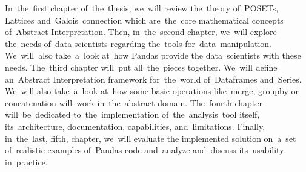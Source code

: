 In~the~first chapter of~the~thesis, we~will review the~theory of~POSETs, Lattices and~Galois~connection which
are~the~core mathematical concepts of~Abstract Interpretation.
Then, in~the~second chapter, we~will explore the~needs of~data scientists regarding the~tools for~data~manipulation.
We~will~also take~a~look at~how Pandas provide the data~scientists with these needs.
The~third chapter will~put all~the~pieces together.
We~will define an~Abstract Interpretation framework for~the~world of~Dataframes and~Series.
We~will also take~a~look at~how some basic operations like~merge, groupby or concatenation will~work in~the~abstract domain.
The~fourth chapter will~be~dedicated to~the~implementation of~the~analysis~tool itself, its~architecture, documentation,
capabilities, and~limitations.
Finally, in~the~last, fifth, chapter, we~will evaluate the implemented solution on~a~set of~realistic examples of~Pandas
code and~analyze and~discuss its~usability in~practice.